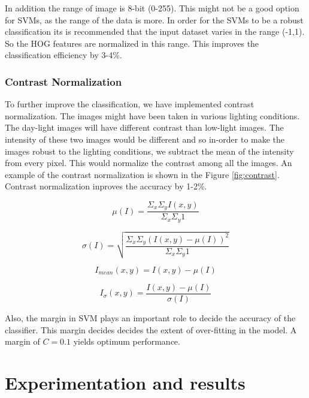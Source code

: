 \documentclass{article} %
\begin{document}
In addition the range of image is 8-bit (0-255). This might not be a good option for SVMs, as the range of the data is more. In order for the SVMs to be a robust classification its is recommended that the input dataset varies in the range (-1,1). So the HOG features are normalized in this range. This improves the classification efficiency by 3-4\%.
\subsubsection{Contrast Normalization}

To further improve the classification, we have implemented contrast normalization. The images might have been taken in various lighting conditions. The day-light images will have different contrast than low-light images. The intensity of these two images would be different and so in-order to make the images robust to the lighting conditions, we subtract the mean of the intensity from every pixel. This would normalize the contrast among all the images. An example of the contrast normalization is shown in the Figure \ref{fig:contrast}. Contrast normalization inproves the accuracy by 1-2\%.

\begin{equation}
\mu(I) = \frac{\Sigma_x \Sigma_y I(x,y)}{\Sigma_x \Sigma_y 1}
\end{equation}

\begin{equation}
\sigma(I) = \sqrt{\frac{\Sigma_x \Sigma_y (I(x,y) - \mu(I))^2}{\Sigma_x \Sigma_y 1}}
\end{equation}

\begin{equation}
I_{mean}(x,y) = I(x,y) - \mu(I)
\end{equation}

\begin{equation}
I_{\sigma}(x,y) = \frac{I(x,y) - \mu(I)}{\sigma(I)}
\label{eqn:isigma}
\end{equation}

Also, the margin in SVM plays an important role to decide the accuracy of the classifier. This margin decides decides the extent of over-fitting in the model. A margin of $C=0.1$ yields optimum performance.


\section{Experimentation and results} %
\label{sub:Results}
\end{document}
